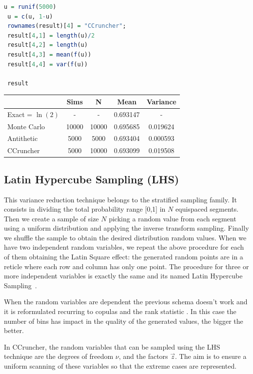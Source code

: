 \documentclass[11pt,fleqn]{book} %
\begin{document}
\begin{example}
\begin{lstlisting}[language=R, label=sc:antithetic, caption=Antithetic example (R script)]
 u = runif(5000)
 u = c(u, 1-u)
 rownames(result)[4] = "CCruncher";
 result[4,1] = length(u)/2
 result[4,2] = length(u)
 result[4,3] = mean(f(u))
 result[4,4] = var(f(u))
 
 result

	\end{lstlisting}
	\hspace*{1cm}
	\begin{tabular}{l|c|c|c|c|}
		\cline{2-5}
		& Sims & N & Mean & Variance \\
		\hline
		\multicolumn{1}{|l|}{Exact = $\ln(2)$} & - & - & 0.693147 & - \\
		\hline
		\multicolumn{1}{|l|}{Monte Carlo} & 10000 & 10000 & 0.695685 & 0.019624 \\
		\hline
		\multicolumn{1}{|l|}{Antithetic} & 5000 & 5000 & 0.693404 & 0.000593 \\
		\hline
		\multicolumn{1}{|l|}{CCruncher} & 5000 & 10000 & 0.693099 & 0.019508 \\
		\hline
	\end{tabular}
\end{example}

\subsection{Latin Hypercube Sampling (LHS)}
This variance reduction technique 
belongs to the stratified sampling family. It consists in dividing the total 
probability range [0,1] in $N$ equispaced segments. Then we create a 
sample of size $N$ picking a random value from each segment using a uniform 
distribution and applying the inverse transform sampling. Finally we shuffle 
the sample to obtain the desired distribution random values. When we have 
two independent random variables, we repeat the above procedure for each of 
them obtaining the Latin Square effect: the generated random points are in
a reticle where each row and column has only one point. The procedure for
three or more independent variables is exactly the same and its named Latin 
Hypercube Sampling~\cite{glasserman:1997}.

When the random variables are dependent the previous schema doesn't work 
and it is reformulated recurring to copulas and the rank statistic 
\cite{wolfgang:2008}. In this case the number of bins has impact in the 
quality of the generated values, the bigger the better.

In CCruncher, the random variables that can be sampled using the LHS 
technique are the degrees of freedom $\nu$, and the factors $\vec{z}$. 
The aim is to ensure a uniform scanning of these variables so that the
extreme cases are represented.
\end{document}
